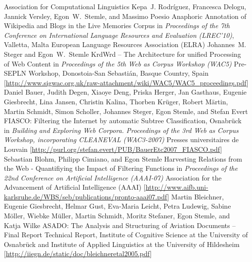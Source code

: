 \documentclass[11pt,a4paper]{moderncv}
\begin{document}
        {\small Association for Computational Linguistics}
        {}
        {Kepa~J. Rodr{\'i}guez, Francesca Delogu, Jannick Versley,
        Egon~W.~Stemle, and Massimo Poesio} {Anaphoric Annotation of Wikipedia
        and Blogs in the Live Memories Corpus}
        {\small in {\em Proceedings of the 7th Conference on International
        Language Resources and Evaluation (LREC'10)}, Valletta, Malta}
        {\small European Language Resources Association (ELRA)}
        {}
        {Johannes~M. Steger and Egon~W.~Stemle}
        {{KrdWrd} -- The Architecture for unified Processing of Web Content}
        {\small in {\em Proceedings of the 5th Web as Corpus Workshop (WAC5)}}
        {\small Pre-SEPLN Workshop, Donostoia-San Sebasti{\'a}n, Basque
        Country, Spain}
        {[\url{http://www.sigwac.org.uk/raw-attachment/wiki/WAC5/WAC5_proceedings.pdf}]}
        {Daniel Bauer, Judith Degen, Xiaoye Deng, Priska Herger, Jan Gasthaus,
        Eugenie Giesbrecht, Lina Jansen, Christin Kalina, Thorben Kr{\"u}ger,
        Robert M{\"a}rtin, Martin Schmidt, Simon Scholler, Johannes Steger,
        Egon Stemle, and Stefan Evert}
        {FIASCO: Filtering the Internet by automatic Subtree Classification,
        Osnabr{\"u}ck}
        {\small in {\em Building and Exploring Web Corpora. Proceedings of the
        3rd Web as Corpus Workshop, incorporating CLEANEVAL (WAC3-2007)}}
        {\small Presses universitaires de Louvain}
        {[\url{http://purl.org/stefan.evert/PUB/BauerEtc2007_FIASCO.pdf}]}
        {Sebastian Blohm, Philipp Cimiano, and Egon Stemle}
        {Harvesting Relations from the Web - Quantifiying the Impact of
        Filtering Functions}
        {\small in {\em Proceedings of the 22nd Conference on Artificial
        Intelligence (AAAI-07)}}
        {\small Association for the Advancement of Artificial Intelligence
        (AAAI)}
        {[\url{http://www.aifb.uni-karlsruhe.de/WBS/seb/publications/pronto-aaai07.pdf}]}
        {Martin Bleichner, Eugenie Giesbrecht, Helmar Gust, Eva-Maria Leicht,
        Petra Ludewig, Sabine M{\"o}ller, Wiebke M{\"u}ller, Martin Schmidt,
        Moritz Stefaner, Egon Stemle, and Katja Wilke}
        {ASADO: The Analysis and Structuring of Aviation Documents -- Final Report}
        {\small Technical Report, Institute of Cognitive Science at the
        University of Osnabr{\"u}ck and Institute of Applied Linguistics at the
        University of Hildesheim}
        {}
        {[\url{http://iiegn.de/static/doc/bleichneretal2005.pdf}]}
\closesection{}
\end{document}
